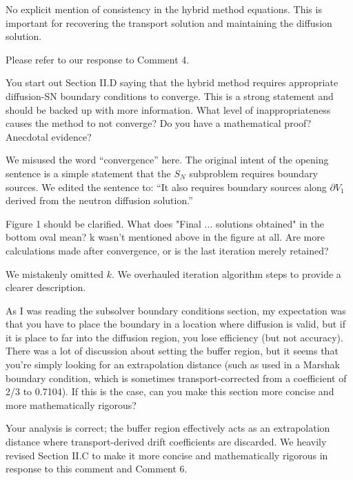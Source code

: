 \documentclass[answers,11pt]{exam}
\begin{document}
\begin{questions}
    \question No explicit mention of consistency in the hybrid method equations. This is important for recovering the transport solution and maintaining the diffusion solution.
    \begin{solution}
        Please refer to our response to Comment 4.
    \end{solution}

    \question You start out Section II.D saying that the hybrid method requires appropriate diffusion-SN boundary conditions to converge. This is a strong statement and should be backed up with more information. What level of inappropriateness causes the method to not converge? Do you have a mathematical proof? Anecdotal evidence?
    \begin{solution}
        We misused the word ``convergence'' here. The
        original intent of the opening sentence is a simple statement that the $S_N$
        subproblem requires boundary sources. We edited
        the sentence to:
        ``It also requires boundary sources along $\partial V_1$ derived from
        the neutron diffusion solution.''
    \end{solution}

    \question Figure 1 should be clarified. What does "Final ... solutions obtained" in the bottom oval mean? k wasn't mentioned above in the figure at all. Are more calculations made after convergence, or is the last iteration merely retained?
    \begin{solution}
        We mistakenly omitted $k$.
        We overhauled iteration algorithm steps to provide a clearer description.
    \end{solution}

    \question As I was reading the subsolver boundary conditions section, my expectation was that you have to place the boundary in a location where diffusion is valid, but if it is place to far into the diffusion region, you lose efficiency (but not accuracy). There was a lot of discussion about setting the buffer region, but it seems that you're simply looking for an extrapolation distance (such as used in a Marshak boundary condition, which is sometimes transport-corrected from a coefficient of 2/3 to 0.7104). If this is the case, can you make this section more concise and more mathematically rigorous?
    \begin{solution}
        Your analysis is correct; the buffer region effectively acts as an extrapolation distance
        where transport-derived drift coefficients are discarded. We heavily revised Section
        II.C to make it more concise and mathematically rigorous in response to this comment and
        Comment 6.
    \end{solution}


\end{questions}
\end{document}
